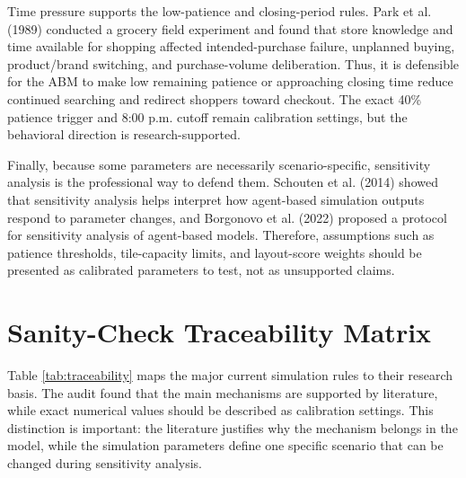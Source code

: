 \documentclass[12pt]{article}
\begin{document}
Time pressure supports the low-patience and closing-period rules. Park et al. (1989) conducted a grocery field experiment and found that store knowledge and time available for shopping affected intended-purchase failure, unplanned buying, product/brand switching, and purchase-volume deliberation. Thus, it is defensible for the ABM to make low remaining patience or approaching closing time reduce continued searching and redirect shoppers toward checkout. The exact 40\% patience trigger and 8:00 p.m. cutoff remain calibration settings, but the behavioral direction is research-supported.

Finally, because some parameters are necessarily scenario-specific, sensitivity analysis is the professional way to defend them. Schouten et al. (2014) showed that sensitivity analysis helps interpret how agent-based simulation outputs respond to parameter changes, and Borgonovo et al. (2022) proposed a protocol for sensitivity analysis of agent-based models. Therefore, assumptions such as patience thresholds, tile-capacity limits, and layout-score weights should be presented as calibrated parameters to test, not as unsupported claims.

\section{Sanity-Check Traceability Matrix}

Table \ref{tab:traceability} maps the major current simulation rules to their research basis. The audit found that the main mechanisms are supported by literature, while exact numerical values should be described as calibration settings. This distinction is important: the literature justifies why the mechanism belongs in the model, while the simulation parameters define one specific scenario that can be changed during sensitivity analysis.
\end{document}
